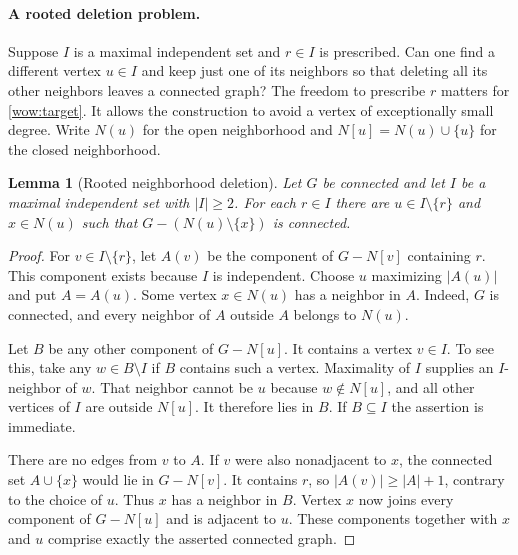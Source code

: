\documentclass[11pt,a4paper]{article}
\newtheorem{lemma}[theorem]{Lemma}
\theoremstyle{definition}
\theoremstyle{remark}
\numberwithin{equation}{section}
\begin{document}
\paragraph{A rooted deletion problem.}
Suppose $I$ is a maximal independent set and $r\in I$ is prescribed.
Can one find a different vertex $u\in I$ and keep just one of its
neighbors so that deleting all its other neighbors leaves a connected
graph? The freedom to prescribe $r$ matters for \eqref{wow:target}.
It allows the construction to avoid a vertex of exceptionally small
degree. Write $N(u)$ for the open neighborhood and
$N[u]=N(u)\cup\{u\}$ for the closed neighborhood.

\begin{lemma}[Rooted neighborhood deletion]\label{wow:star}
Let $G$ be connected and let $I$ be a maximal independent set with
$|I|\ge2$. For each $r\in I$ there are $u\in I\setminus\{r\}$ and
$x\in N(u)$ such that $G-(N(u)\setminus\{x\})$ is connected.
\end{lemma}
\begin{proof}
For $v\in I\setminus\{r\}$, let $A(v)$ be the component of $G-N[v]$
containing $r$. This component exists because $I$ is independent.
Choose $u$ maximizing $|A(u)|$ and put $A=A(u)$. Some vertex
$x\in N(u)$ has a neighbor in $A$. Indeed, $G$ is connected, and every
neighbor of $A$ outside $A$ belongs to $N(u)$.

Let $B$ be any other component of $G-N[u]$. It contains a vertex
$v\in I$. To see this, take any $w\in B\setminus I$ if $B$ contains
such a vertex. Maximality of $I$ supplies an $I$-neighbor of $w$.
That neighbor cannot be $u$ because $w\notin N[u]$, and all other
vertices of $I$ are outside $N[u]$. It therefore lies in $B$. If
$B\subseteq I$ the assertion is immediate.

There are no edges from $v$ to $A$. If $v$ were also nonadjacent to
$x$, the connected set $A\cup\{x\}$ would lie in $G-N[v]$. It
contains $r$, so $|A(v)|\ge |A|+1$, contrary to the choice of $u$.
Thus $x$ has a neighbor in $B$. Vertex $x$ now joins every component
of $G-N[u]$ and is adjacent to $u$. These components together with
$x$ and $u$ comprise exactly the asserted connected graph.
\end{proof}
\end{document}
